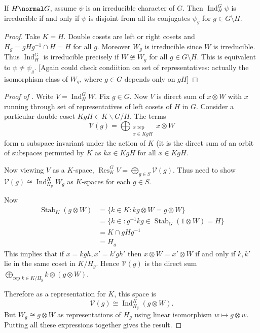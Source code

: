 \documentclass[a4paper]{article}
\DeclareMathOperator{\Res}{Res} %
\DeclareMathOperator{\Ind}{Ind} %
\theoremstyle{definition}
\begin{document}
\begin{corollary}
  If \(H \normal G\), assume \(\psi\) is an irreducible character of \(G\). Then \(\Ind_H^G \psi\) is irreducible if and only if \(\psi\) is disjoint from all its conjugates \(\psi_g\) for \(g \in G \setminus H\).
\end{corollary}

\begin{proof}
  Take \(K = H\). Double cosets are left or right cosets and \(H_g = gHg^{-1} \cap H = H\) for all \(g\). Moreover \(W_g\) is irreducible since \(W\) is irreducible. Thus \(\Ind_H^G\) is irreducible precisely if \(W \ncong W_g\) for all \(g \in G \setminus H\). This is equivalent to \(\psi \neq \psi_g\). [Again could check condiition on set of representatives: actually the isomorphism class of \(W_g\), where \(g \in G\) depends only on \(gH\)]
\end{proof}

\begin{proof}[Proof of ]
  Write \(V = \Ind_H^G W\). Fix \(g \in G\). Now \(V\) is direct sum of \(x \otimes W\) with \(x\) running through set of representatives of left cosets of \(H\) in \(G\). Consider a particular double coset \(KgH \in K \backslash G/H\). The terms
  \[
    \mathcal V(g) = \bigoplus_{\substack{x \text{ rep} \\ x \in KgH}} x \otimes W
  \]
  form a subspace invariant under the action of \(K\) (it is the direct sum of an orbit of subspaces permuted by \(K\) as \(kx \in KgH\) for all \(x \in KgH\).

  Now viewing \(V\) as a \(K\)-space, \(\Res_K^G V = \bigoplus_{g \in S} \mathcal V(g)\). Thus need to show \(\mathcal V(g) \cong \Ind_{H_g}^K W_g\) as \(K\)-spaces for each \(g \in S\).

  Now
  \begin{align*}
    \operatorname{Stab}_K (g \otimes W)
    &= \{k \in K: kg \otimes W = g \otimes W\} \\
    &= \{k \in : g^{-1}kg \in \operatorname{Stab}_G(1 \otimes W) = H\} \\
    &= K \cap gHg^{-1} \\
    &= H_g
  \end{align*}
  This implies that if \(x = kgh, x' = k'gh'\) then \(x \otimes W = x' \otimes W\) if and only if \(k, k'\) lie in the same coset in \(K/H_g\). Hence \(\mathcal V(g)\) is the direct sum \(\bigoplus_{\text{rep } k \in K/H_g} k \otimes (g \otimes W)\).

  Therefore as a representation for \(K\), this space is
  \[
    \mathcal V(g) \cong \Ind_{H_g}^K (g \otimes W).
  \]
  But \(W_g \cong g \otimes W\) as representations of \(H_g\) using linear isomorphism \(w \mapsto g \otimes w\). Putting all these expressions together gives the result.
\end{proof}
\end{document}
